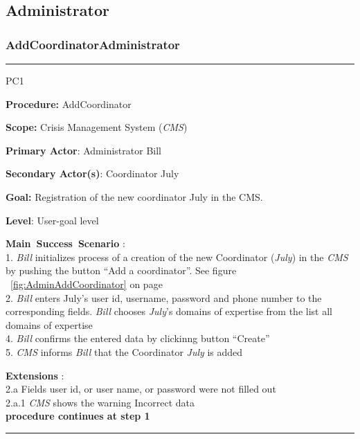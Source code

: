 \subsection{Administrator}

\subsubsection{AddCoordinatorAdministrator}

\vspace{0.5cm}
\hrule
\begin{lyxlist}{PC1}
\small{
\item [\textbf{Procedure:}] AddCoordinator
\item [\textbf{Scope:}] Crisis Management System (\emph{CMS})
\item [\textbf{Primary Actor}:] Administrator Bill
\item [\textbf{Secondary Actor(s)}:] Coordinator July
\item [\textbf{Goal:}] Registration of the new coordinator July in the CMS.
\item [\textbf{Level}:] User-goal level
\item [\textbf{Main~Success~Scenario}]:\\
1. \emph{Bill} initializes process of a creation of the new Coordinator
(\emph{July}) in the \emph{CMS} by pushing the button ``Add a coordinator''. See
figure ~\ref{fig:AdminAddCoordinator} on page~\pageref{fig:AdminAddCoordinator}\\
2. \emph{Bill} enters July's user id, username, password and phone number to the
corresponding fields. \emph{Bill} chooses \emph{July}'s domains of expertise
from the list all domains of expertise\\
4. \emph{Bill} confirms the entered data by clickinng button ``Create''\\
5. \emph{CMS} informs \emph{Bill} that the Coordinator \emph{July} is added

\item [\textbf{Extensions}]:\\
2.a Fields user id, or user name, or password were not filled out\\
\hspace*{0.5cm} 2.a.1 \emph{CMS} shows the warning Incorrect data\\
\hspace*{0.5cm} \textbf{procedure continues at step 1}

}
\end{lyxlist}
\hrule
\vspace{0.5cm}

